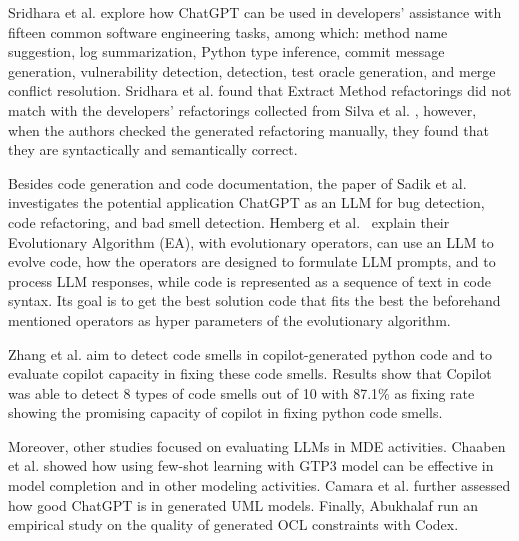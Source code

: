 Sridhara et al. \cite{sridhara2023chatgpt} explore how ChatGPT can be used in developers' assistance with fifteen common software engineering tasks, among which: method name suggestion, log summarization, Python type inference, commit message generation, vulnerability detection, detection, test oracle generation, and merge conflict resolution. Sridhara et al. \cite{sridhara2023chatgpt} found that Extract Method refactorings did not match with the developers' refactorings collected from Silva et al. \cite{10.1145/2950290.2950305}, however, when the authors checked the generated refactoring manually, they found that they are syntactically and semantically correct.

  Besides code generation and code documentation, the paper of Sadik et al.~\cite{sadik2023analysis} investigates the potential application ChatGPT as an LLM for bug detection, code refactoring, and bad smell detection.
  Hemberg et al.~\cite{hemberg2024evolving} explain their Evolutionary Algorithm (EA), with evolutionary operators, can use an LLM to evolve code, how the operators are designed to formulate LLM prompts, and to process LLM responses, while code is represented as a sequence of text in code syntax. Its goal is to get the best solution code that fits the best the beforehand mentioned operators as hyper parameters of the evolutionary algorithm.
  
   Zhang et al.\cite{zhang2024copilot} aim to detect code smells in  copilot-generated python code and to evaluate copilot capacity in fixing these code smells. Results show that Copilot was able to detect 8 types of code smells out of 10 with 87.1\% as fixing rate showing the promising capacity of copilot in fixing python code smells.
  
 Moreover, other studies focused on evaluating LLMs in MDE activities. 
 Chaaben et al. \cite{chaaben2023towards} showed how using few-shot learning with GTP3 model can be effective in model completion and in other modeling activities. 
 Camara et al. \cite{camara2023assessment} further assessed how good ChatGPT is in generated UML models.
 Finally, Abukhalaf \cite{AbukhalafHK23} run an empirical study on the quality of generated OCL constraints with Codex.
 
